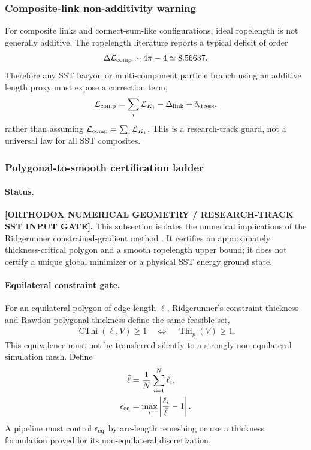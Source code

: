 \subsubsection{Composite-link non-additivity warning}
For composite links and connect-sum-like configurations, ideal ropelength is
not generally additive.  The ropelength literature reports a typical deficit
of order
\begin{align}
    \Delta\mathcal L_{\rm comp}
    \sim
    4\pi-4
    \simeq 8.56637 .
    \label{eq:rt_composite_link_deficit}
\end{align}
Therefore any SST baryon or multi-component particle branch using an additive
length proxy must expose a correction term,
\begin{align}
    \mathcal L_{\rm comp}
    =
    \sum_i\mathcal L_{K_i}
    -\Delta_{\rm link}
    +\delta_{\rm stress},
    \label{eq:rt_composite_nonadditive_length}
\end{align}
rather than assuming $\mathcal L_{\rm comp}=\sum_i\mathcal L_{K_i}$.  This is a
research-track guard, not a universal law for all SST composites.


\subsubsection{Polygonal-to-smooth certification ladder}
\label{subsubsec:rt_polygonal_smooth_certification}
\paragraph{Status.}
\textbf{[ORTHODOX NUMERICAL GEOMETRY / RESEARCH-TRACK SST INPUT GATE].}
This subsection isolates the numerical implications of the Ridgerunner
constrained-gradient method \cite{AshtonCantarellaPiatekRawdon2011}.  It
certifies an approximately thickness-critical polygon and a smooth ropelength
upper bound; it does not certify a unique global minimizer or a physical SST
energy ground state.

\paragraph{Equilateral constraint gate.}
For an equilateral polygon of edge length $\ell$, Ridgerunner's constraint
thickness and Rawdon polygonal thickness define the same feasible set,
\begin{align}
    \operatorname{CThi}(\ell,V)\ge1
    \quad\Longleftrightarrow\quad
    \operatorname{Thi}_p(V)\ge1 .
    \label{eq:rt_cthi_thip_equivalence}
\end{align}
This equivalence must not be transferred silently to a strongly
non-equilateral simulation mesh.  Define
\begin{align}
    \bar\ell
    &=\frac1N\sum_{i=1}^{N}\ell_i,\\
    \epsilon_{\rm eq}
    &=
    \max_i\left|\frac{\ell_i}{\bar\ell}-1\right| .
    \label{eq:rt_equilateral_error}
\end{align}
A pipeline must control $\epsilon_{\rm eq}$ by arc-length remeshing or use a
thickness formulation proved for its non-equilateral discretization.

